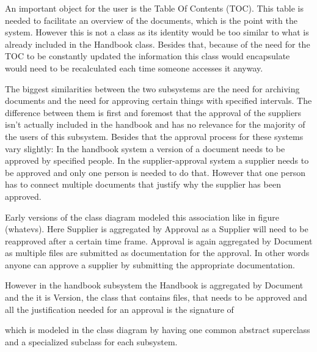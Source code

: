 An important object for the user is the Table Of Contents (TOC). This table is needed to facilitate an overview of the documents, which is the point with the system. However this is not a class as its identity would be too similar to what is already included in the Handbook class. Besides that, because of the need for the TOC to be constantly updated the information this class would encapsulate would need to be recalculated each time someone accesses it anyway.

The biggest similarities between the two subsystems are the need for archiving documents and the need for approving certain things with specified intervals. 
The difference between them is first and foremost that the approval of the suppliers isn't actually included in the handbook and has no relevance for the majority of the users of this subsystem. Besides that the approval process for these systems vary slightly: 
In the handbook system a version of a document needs to be approved by specified people. 
In the supplier-approval system a supplier needs to be approved and only one person is needed to do that. 
However that one person has to connect multiple documents that justify why the supplier has been approved.

Early versions of the class diagram modeled this association like in figure (whatevs). Here Supplier is aggregated by Approval as a Supplier will need to be reapproved after a certain time frame. Approval is again aggregated by Document as multiple files are submitted as documentation for the approval. In other words anyone can approve a supplier by submitting the appropriate documentation.

However in the handbook subsystem the Handbook is aggregated by Document and the 
it is Version, the class that contains files, that needs to be approved and all the justification needed for an approval is the signature of 



 which is modeled in the class diagram by having one common abstract superclass and a specialized subclass for each subsystem.
